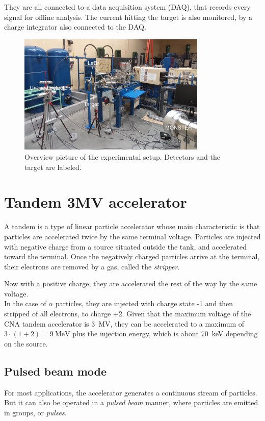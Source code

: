 \documentclass[a4paper,12pt]{report}
\begin{document}
They are all connected to a data acquisition system (DAQ), that records every signal for offline analysis.
The current hitting the target is also monitored, by a charge integrator also connected to the DAQ.

\begin{figure}[H]
	\centering
	\includegraphics[width=0.80\textwidth]{overview_photo.jpg}
	\caption{Overview picture of the experimental setup.
	Detectors and the target are labeled.}
	\label{overview_photo}
\end{figure}

\section{Tandem 3MV accelerator}
A tandem is a type of linear particle accelerator whose main characteristic is that particles are accelerated twice by the same terminal voltage.
Particles are injected with negative charge from a source situated outside the tank, and accelerated toward the terminal.
Once the negatively charged particles arrive at the terminal, their electrons are removed by a gas, called the \textit{stripper}.

Now with a positive charge, they are accelerated the rest of the way by the same voltage.
\\

In the case of $\alpha$ particles, they are injected with charge state -1 and then stripped of all electrons, to charge +2.
Given that the maximum voltage of the CNA tandem accelerator is \qty{3}{\mega\volt}, they can be accelerated to a maximum of $3\cdot\left(1+2\right) = \qty{9}{\mega\eV}$ plus the injection energy, which is about \qty{70}{\keV} depending on the source.
\\

\subsection{Pulsed beam mode}
For most applications, the accelerator generates a continuous stream of particles.
But it can also be operated in a \textit{pulsed beam} manner, where particles are emitted in groups, or \textit{pulses}.
\end{document}
